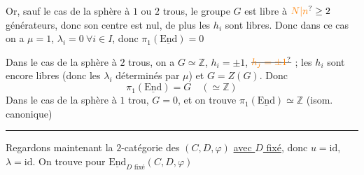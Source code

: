 Or, sauf le cas de la sphère à $1$ ou $2$ trous, le groupe $G$ est libre à $\unsure{N|n}\geq2$ générateurs, donc son centre est nul, de plus les $h_i$ sont libres. Donc dans ce cas on a $\mu=1$, $\lambda_i=0\ \forall i\in I$, donc $\boxed{\pi_1(\underline{\mathrm{End}})=0}$

Dans le cas de la sphère à $2$ trous,  on a $G\simeq\mathbb Z$, $h_i=\pm1$, $\deleted{\unsure{h_j=\pm1}}$ ; les $h_i$ sont encore libres (donc les $\lambda_i$ déterminés par $\mu$) et $G=Z(G)$. Donc
\[
\pi_1(\underline{\mathrm{End}})=G\quad(\simeq\mathbb Z)
\]
Dans le cas de la sphère à $1$ trou, $G=0$, et on trouve $\pi_1(\underline{\mathrm{End}})\simeq\mathbb Z$ (isom. canonique)

\begin{center}\rule{1.5cm}{.4pt}\end{center}

Regardons maintenant la $2$-catégorie des $(C,D,\varphi)$ \uline{avec $D$ fixé}, donc $u=\mathrm{id}$, $\lambda=\mathrm{id}$. On trouve pour $\underline{\mathrm{End}}_{D\text{ fixé}}(C,D,\varphi)$


